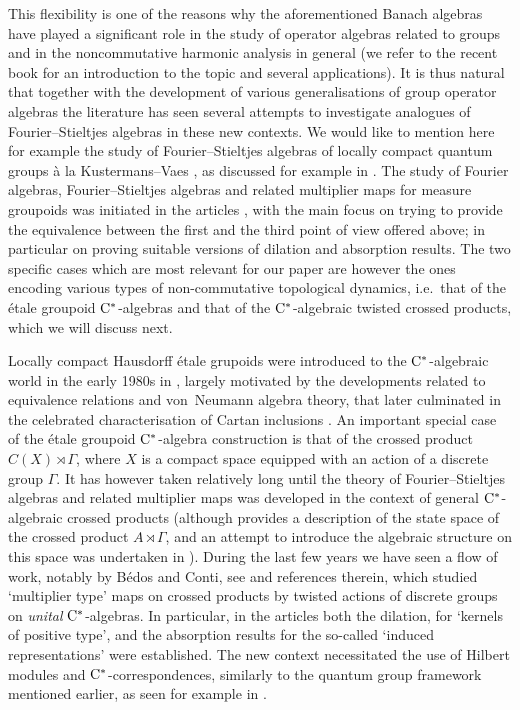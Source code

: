 \documentclass[11 pt, leqno]{amsart}
\numberwithin{equation}{section}
\theoremstyle{plain}
\theoremstyle{definition}
\newcommand{\cst}{\ifmmode\mathrm{C}^*\else{$\mathrm{C}^*$}\fi}
\begin{document}
This flexibility is one of the reasons why the aforementioned Banach algebras have played a significant role in the study of operator algebras related to groups and in the noncommutative harmonic analysis in general (we refer to the recent book \cite{KaniuthLau} for an introduction to the topic and several applications). 
It is thus natural that together with the development of various generalisations of group operator algebras the literature has seen several attempts to investigate analogues of Fourier--Stieltjes algebras in these new contexts. 
We would like to mention here for example the study of Fourier--Stieltjes algebras of locally compact quantum groups \`a la Kustermans--Vaes \cite{KuV}, as discussed for example in \cite{Daws}. 
The study of Fourier algebras, Fourier--Stieltjes algebras and related multiplier maps for  measure groupoids was initiated in the articles \cite{RenaultFourier,RamsayWalter,Oty}, with the main focus on trying to provide the equivalence between the first and the third point of view offered above; in particular on proving suitable versions of dilation and absorption results. 
The two specific cases which are most relevant for our paper are however the  ones encoding various types of non-commutative topological dynamics, i.e.\ that of the \'etale groupoid $\cst$-algebras and that of the $\cst$-algebraic twisted crossed products, which we will discuss next.

Locally compact Hausdorff \'etale grupoids were introduced to the $\cst$-algebraic world in the early 1980s in \cite{Renault0}, largely motivated by the developments related to equivalence relations and von~Neumann algebra theory, that later culminated in the celebrated characterisation of Cartan inclusions \cite{Re}.
An important special case of the \'etale groupoid $\cst$-algebra construction is that of the crossed product $C(X)\rtimes \Gamma$, where $X$ is a compact space equipped with an action of a discrete group $\Gamma$. 
It has however taken relatively long until the theory of Fourier--Stieltjes algebras and related multiplier maps was developed in the context of general $\cst$-algebraic crossed products (although \cite[Section 7.6]{Pedersen} provides a description of the state space of the crossed product $A \rtimes \Gamma$, and an attempt to introduce the algebraic structure on this space was undertaken in \cite{Fujita}). 
During the last few years we have seen a flow of work, notably by B\'edos and Conti, see \cite{BedosConti2,BedosConti3} and references therein, which studied `multiplier type' maps on  crossed products by twisted actions of discrete groups on \emph{unital} $\cst$-algebras. 
In particular, in the articles \cite{BedosConti,BedosConti2} both the dilation, for `kernels of positive type', and the absorption results for the so-called `induced representations' were established. 
The new context necessitated the use of Hilbert modules and $\cst$-correspondences, similarly to the quantum group framework mentioned earlier, as seen for example in \cite{Daws2}.
\end{document}
